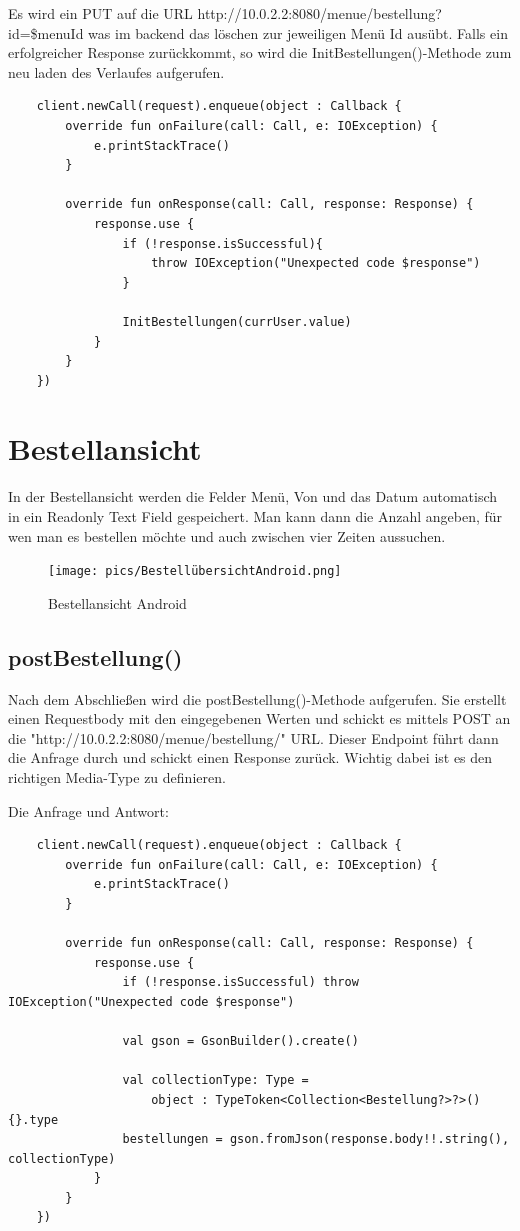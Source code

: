 Es wird ein PUT auf die URL http://10.0.2.2:8080/menue/bestellung?id=\$menuId was im backend das löschen zur jeweiligen Menü Id ausübt.
Falls ein erfolgreicher Response zurückkommt, so wird die InitBestellungen()-Methode zum neu laden des Verlaufes aufgerufen.

\begin{lstlisting}
    client.newCall(request).enqueue(object : Callback {
        override fun onFailure(call: Call, e: IOException) {
            e.printStackTrace()
        }

        override fun onResponse(call: Call, response: Response) {
            response.use {
                if (!response.isSuccessful){
                    throw IOException("Unexpected code $response")
                }

                InitBestellungen(currUser.value)
            }
        }
    })
\end{lstlisting}


\pagebreak


\section{Bestellansicht}

In der Bestellansicht werden die Felder Menü, Von und das Datum automatisch in ein Readonly Text Field gespeichert.
Man kann dann die Anzahl angeben, für wen man es bestellen möchte und auch zwischen vier Zeiten aussuchen. 

\begin{figure}[htp]
    \centering
    \author{Bozidar Spasenovic}
    \texttt{[image: pics/BestellübersichtAndroid.png]}
    \caption{Bestellansicht Android}
    \label{fig:impl:BestellübersichtAndroid}
\end{figure}

\subsection{postBestellung()}
Nach dem Abschließen wird die postBestellung()-Methode aufgerufen. Sie erstellt einen Requestbody mit den eingegebenen Werten
und schickt es mittels POST an die "http://10.0.2.2:8080/menue/bestellung/" URL. Dieser Endpoint führt dann die Anfrage durch und schickt einen Response zurück.
Wichtig dabei ist es den richtigen Media-Type zu definieren. 

Die Anfrage und Antwort:
\begin{lstlisting}
    client.newCall(request).enqueue(object : Callback {
        override fun onFailure(call: Call, e: IOException) {
            e.printStackTrace()
        }

        override fun onResponse(call: Call, response: Response) {
            response.use {
                if (!response.isSuccessful) throw IOException("Unexpected code $response")

                val gson = GsonBuilder().create()

                val collectionType: Type =
                    object : TypeToken<Collection<Bestellung?>?>() {}.type
                bestellungen = gson.fromJson(response.body!!.string(), collectionType)
            }
        }
    })
\end{lstlisting}

